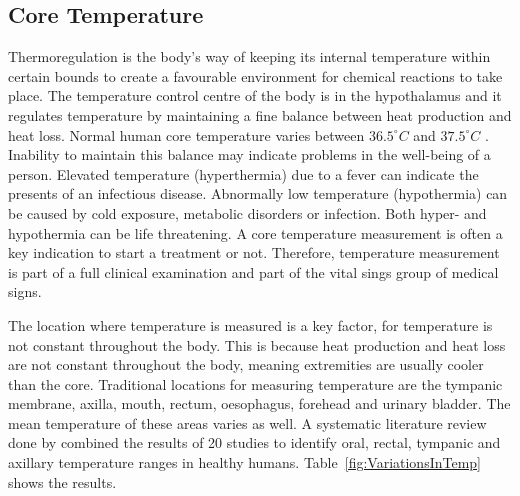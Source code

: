 \subsection{Core Temperature}
Thermoregulation is the body's way of keeping its internal temperature within certain bounds to create a favourable environment for chemical reactions to take place. The temperature control centre of the body is in the hypothalamus and it regulates temperature by maintaining a fine balance between heat production and heat loss. Normal human core temperature varies between $36.5^{\circ}C$ and $37.5^{\circ}C$ \citep{jones2010biomedical}. Inability to maintain this balance may indicate problems in the well-being of a person. Elevated temperature (hyperthermia) due to a fever can indicate the presents of an infectious disease. Abnormally low temperature (hypothermia) can be caused by cold exposure, metabolic disorders or infection. Both hyper- and hypothermia can be life threatening. A core temperature measurement is often a key indication to start a treatment or not. Therefore, temperature measurement is part of a full clinical examination and part of the vital sings group of medical signs.

\medskip

The location where temperature is measured is a key factor, for temperature is not constant throughout the body. This is because heat production and heat loss are not constant throughout the body, meaning extremities are usually cooler than the core. Traditional locations for measuring temperature are the tympanic membrane, axilla, mouth, rectum, oesophagus, forehead and urinary bladder. The mean temperature of these areas varies as well. A systematic literature review done by \cite{sund2002normal} combined the results of 20 studies to identify oral, rectal, tympanic and axillary temperature ranges in healthy humans. Table~\ref{fig:VariationsInTemp} shows the results.

